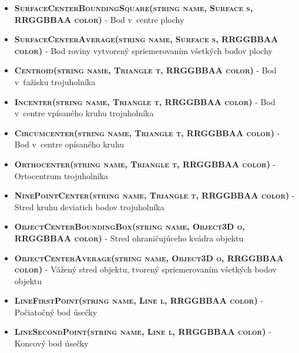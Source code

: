 \begin{itemize}
\item \textsc{\textbf{SurfaceCenterBoundingSquare(string name, Surface s, RRGGBBAA color)}} - Bod v~centre plochy %

\item \textsc{\textbf{SurfaceCenterAverage(string name, Surface s, RRGGBBAA color) }} - Bod roviny vytvorený spriemerovaním všetkých bodov plochy%

\item \textsc{\textbf{Centroid(string name, Triangle t, RRGGBBAA color)}} - Bod v~ťažisku trojuholníka %

\item \textsc{\textbf{Incenter(string name, Triangle t, RRGGBBAA color)}} - Bod v~centre vpísaného kruhu trojuholníka%

\item \textsc{\textbf{Circumcenter(string name, Triangle t, RRGGBBAA color) }} - Bod v~centre opísaného kruhu %

\item \textsc{\textbf{Orthocenter(string name, Triangle t, RRGGBBAA color)}} - Ortocentrum trojuholníka %

\item \textsc{\textbf{NinePointCenter(string name, Triangle t, RRGGBBAA color)}} - Stred kruhu deviatich bodov trojuholníka %

\item \textsc{\textbf{ObjectCenterBoundingBox(string name, Object3D o, RRGGBBAA color)}} - Stred ohraničujúceho kvádra objektu%

\item \textsc{\textbf{ObjectCenterAverage(string name, Object3D o, RRGGBBAA color)}} - Vážený stred objektu, tvorený spriemerovaním všetkých bodov objektu%

\item \textsc{\textbf{LineFirstPoint(string name, Line l, RRGGBBAA color)}} - Počiatočný bod úsečky%

\item \textsc{\textbf{LineSecondPoint(string name, Line l, RRGGBBAA color)}} - Koncový bod úsečky%

\end{itemize}

